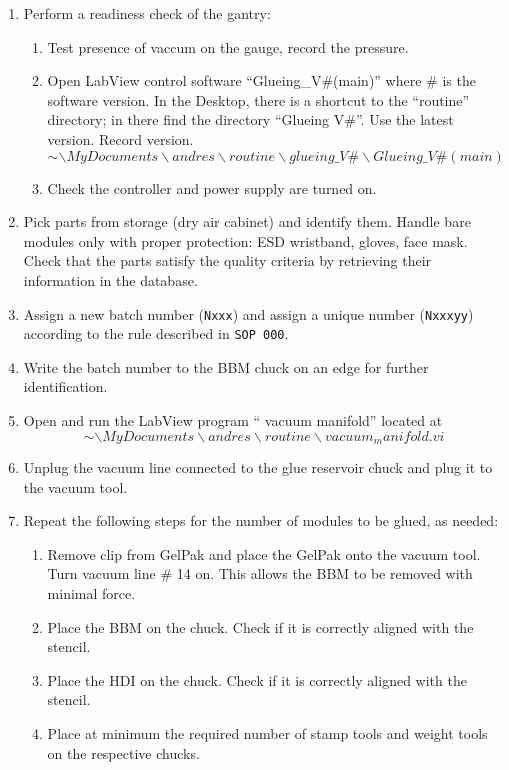 \documentclass[12pt]{unlsilabsop}
\begin{document}
\begin{enumerate}
    \item Perform a readiness check of the gantry:
    \begin{enumerate}
        \item Test presence of vaccum on the gauge, record the pressure.
        \item Open LabView control software ``Glueing\_V\#(main)''  where $\#$ is the software version. In the Desktop, there is a shortcut to the ``routine'' directory; in there find the directory ``Glueing V\#''. Use the latest version. Record version.$$ \sim\backslash MyDocuments\backslash andres\backslash routine\backslash glueing\_V\#\backslash Glueing\_V\#(main)$$
        \item Check the controller and power supply are turned on.
    \end{enumerate}
    \item Pick parts from storage (dry air cabinet) and identify them. Handle bare modules only with proper protection: ESD wristband, gloves, face mask. Check that the parts satisfy the quality criteria by retrieving their information in the database.
    \item Assign a new batch number (\texttt{Nxxx}) and assign a unique number (\texttt{Nxxxyy}) according to the rule described in \texttt{SOP~000}.
    \item Write the batch number to the BBM chuck on an edge for further identification.
    \item Open and run the LabView program `` vacuum manifold'' located at $$ \sim\backslash MyDocuments\backslash andres\backslash routine\backslash vacuum_manifold.vi$$
    \item Unplug the vacuum line connected to the glue reservoir chuck and plug it to the vacuum tool. 
    \item Repeat the following steps for the number of modules to be glued, as needed:
    \begin{enumerate}
        \item Remove clip from GelPak and place the GelPak onto the vacuum tool. Turn vacuum line \# 14 on. This allows the BBM to be removed with minimal force.
        \item Place the BBM on the chuck. Check if it is correctly aligned with the stencil.
        \item Place the HDI on the chuck. Check if it is correctly aligned with the stencil.
        \item Place at minimum the required number of stamp tools and weight tools on the respective chucks.

\end{enumerate}
\end{enumerate}
\end{document}
